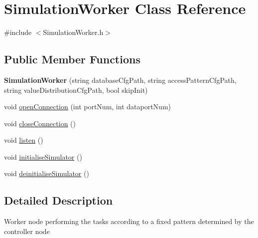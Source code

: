 \hypertarget{classSimulationWorker}{
\section{SimulationWorker Class Reference}
\label{classSimulationWorker}
}


{\ttfamily \#include $<$SimulationWorker.h$>$}\subsection*{Public Member Functions}
\begin{DoxyCompactItemize}
\item 
\hypertarget{classSimulationWorker_a44b25296237849bb3b8affad2956e87d}{
{\bfseries SimulationWorker} (string databaseCfgPath, string accessPatternCfgPath, string valueDistributionCfgPath, bool skipInit)}
\label{classSimulationWorker_a44b25296237849bb3b8affad2956e87d}

\item 
void \hyperlink{classSimulationWorker_ac8e581d784c84d98db09c3261395d2ed}{openConnection} (int portNum, int dataportNum)
\item 
void \hyperlink{classSimulationWorker_aaccde1ec2e77fb934b67718c104e69e8}{closeConnection} ()
\item 
void \hyperlink{classSimulationWorker_a18064a1d65824d3c6a522cf68e52e3f5}{listen} ()
\item 
void \hyperlink{classSimulationWorker_aba581c4c9cbdaf10624822e687efd08e}{initialiseSimulator} ()
\item 
void \hyperlink{classSimulationWorker_aa415eb89cba4b39457faed0baa65458c}{deinitialiseSimulator} ()
\end{DoxyCompactItemize}


\subsection{Detailed Description}
Worker node performing the tasks according to a fixed pattern determined by the controller node 

